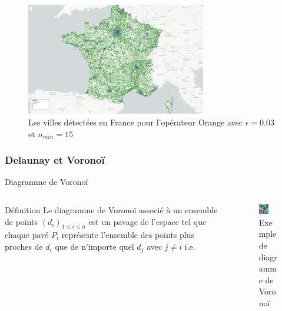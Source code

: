 {\begin{frame}{}
    \begin{figure}
        \includegraphics[width=0.7\textwidth]{images/France-Villes-Orange_0.03_15.png}
        \caption{\label{fig:fr-vi-or-0.03-15}Les villes détectées en France pour l'opérateur Orange avec $\epsilon=0.03$ et $n_{min}=15$}
    \end{figure}
\end{frame}


\subsubsection{Delaunay et Voronoï}

\begin{frame}{Diagramme de Voronoï}
    \begin{columns}
        \begin{column}{0.6\textwidth}
            \begin{block}{Définition}
                Le diagramme de Voronoï associé à un ensemble de points $(d_i)_{1\leq i \leq n}$ est un pavage de l'espace tel que chaque pavé $P_i$ représente l'ensemble des points plus proches de $d_i$ que de n'importe quel $d_j$ avec $j\neq i$ i.e.
            \end{block}
        \end{column}
            
        \begin{column}{0.4\textwidth}
            \begin{figure}
                \includegraphics[width=0.5\textwidth]{images/Coloured_Voronoi_2D.png}
                \caption{\label{fig:vor-ex}Exemple de diagramme de Voronoï}
            \end{figure}
        \end{column}
    \end{columns}
    

\end{frame}}
